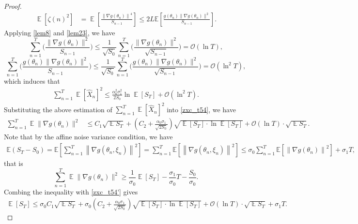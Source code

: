 \documentclass[standalone]{article}
\newcommand{\E}{\mathbb{E}}
\DeclareMathOperator{\Expect}{\mathbb{E}}
\begin{document}
\begin{proof}
\begin{align}
\Expect\left[\zeta(n)^2\right]  &  = \Expect \left[\frac{\left\|\nabla g(\theta_n)\right\|^4}{S_{n-1}}\right] \leq 2 L\E\left[\frac{g(\theta_{n})\|\nabla g(\theta_{n})\|^{2}}{S_{n-1}}\right].
\end{align}
Applying \cref{lem8} and \cref{lem23}, we have
\[\sum_{n=1}^{T}\bigg(\frac{\|\nabla g(\theta_{n})\|^{2}}{S_{n-1}}\bigg)\le \frac{1}{\sqrt{S_{0}}}\sum_{n=1}^{T}\bigg(\frac{\|\nabla g(\theta_{n})\|^{2}}{\sqrt{S_{n-1}}}\bigg)=\mathcal{O}(\ln T),\]\[ \sum_{n=1}^{T}\bigg(\frac{g(\theta_{n})\|\nabla g(\theta_{n})\|^{2}}{S_{n-1}}\bigg)\le \frac{1}{\sqrt{S_{0}}}\sum_{n=1}^{T}\bigg(\frac{g(\theta_{n})\|\nabla g(\theta_{n})\|^{2}}{\sqrt{S_{n-1}}}\bigg)=\mathcal{O}(\ln^{2} T),\] which induces that
\begin{equation}\nonumber\begin{aligned}
\sum_{n=1}^{T}\Expect[\hat{X}_{n}]^{2}\le \frac{\alpha_{0}^{2}\sigma_{1}^{2}}{2S_{0}}\ln\Expect[S_{T}]+\mathcal{O}(\ln^{2}T).
\end{aligned}\end{equation}
Substituting the above estimation of $\sum_{n=1}^{T}\Expect[\hat{X}_{n}]^{2}$ into \cref{zxc_t54}, we have
\begin{equation}\label{zxc_t54'}\begin{aligned}
\sum_{n=1}^{T}\Expect\|\nabla g(\theta_{n})\|^{2}&\le C_1\sqrt{\Expect{S_{T}}}+ \left(C_2 + \frac{\alpha_0\sigma_1}{\sqrt{2S_0}}\right)\sqrt{\Expect[S_{T}]\cdot \ln \Expect[S_{T}]}+\mathcal{O}({\ln T})\cdot\sqrt{\Expect S_{T}}.
\end{aligned}\end{equation} 
Note that by the affine noise variance condition, we have 
\begin{align*}
\E(S_T - S_0)=\E\left[\sum_{n=1}^{T}\left\|\nabla g(\theta_n,\xi_n) \right\|^2\right]= \sum_{n=1}^{T}\E\left[\left\|\nabla g(\theta_n,\xi_n) \right\|^2\right] \leq \sigma_0\sum_{n=1}^{T} \E\left[\left\|\nabla g(\theta_n) \right\|^2\right] + \sigma_1 T, 
\end{align*} 
that is 
\[\sum_{n=1}^{T}\Expect\|\nabla g(\theta_{n})\|^{2}\ge \frac{1}{\sigma_{0}}\Expect[S_{T}]-\frac{\sigma_{1}}{\sigma_{0}}T-\frac{S_{0}}{\sigma_{0}}.\]
Combing the inequality with \cref{zxc_t54'} gives
\begin{equation}\nonumber\begin{aligned}
\Expect[S_{T}]\le \sigma_0C_1\sqrt{\Expect{S_{T}}}+ \sigma_0\left(C_2 + \frac{\alpha_0\sigma_1}{\sqrt{2S_0}}\right)\sqrt{\Expect[S_{T}]\cdot \ln \Expect[S_{T}]}+\mathcal{O}({\ln T})\cdot\sqrt{\Expect S_{T}}+ \sigma_1 T.

\end{aligned}
\end{equation}
\end{proof}
\end{document}
